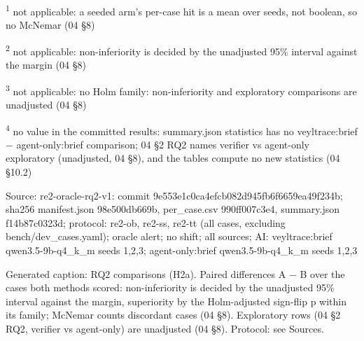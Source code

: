 \par\raggedright\noindent
\textsuperscript{1} not applicable: a seeded arm's per-case hit is a mean over seeds, not boolean, so no McNemar (04 \S{}8)\par
\textsuperscript{2} not applicable: non-inferiority is decided by the unadjusted 95\% interval against the margin (04 \S{}8)\par
\textsuperscript{3} not applicable: no Holm family: non-inferiority and exploratory comparisons are unadjusted (04 \S{}8)\par
\textsuperscript{4} no value in the committed results: summary.json statistics has no veyltrace:brief $-$ agent-only:brief comparison; 04 \S{}2 RQ2 names verifier vs agent-only exploratory (unadjusted, 04 \S{}8), and the tables compute no new statistics (04 \S{}10.2)\par
\noindent Source: re2-oracle-rq2-v1: commit 9e553e1c0ca4efcb082d945fb6f6659ea49f234b; sha256 manifest.json 98e500db669b, per\_case.csv 990ff007c3e4, summary.json f14b87c0323d; protocol: re2-ob, re2-ss, re2-tt (all cases, excluding bench/\allowbreak{}dev\_cases.yaml); oracle alert; no shift; all sources; AI: veyltrace:brief qwen3.5-9b-q4\_k\_m seeds 1,2,3; agent-only:brief qwen3.5-9b-q4\_k\_m seeds 1,2,3\par
\noindent Generated caption: RQ2 comparisons (H2a). Paired differences A $-$ B over the cases both methods scored: non-inferiority is decided by the unadjusted 95\% interval against the margin, superiority by the Holm-adjusted sign-flip p within its family; McNemar counts discordant cases (04 \S{}8). Exploratory rows (04 \S{}2 RQ2, verifier vs agent-only) are unadjusted (04 \S{}8). Protocol: see Sources.\par
\endgroup
